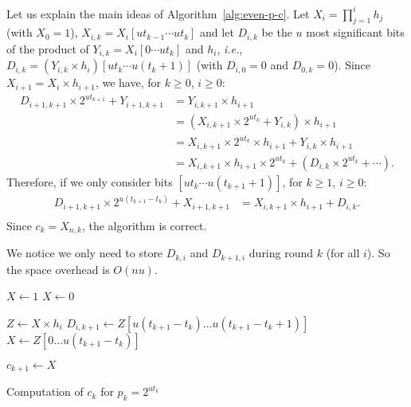 \documentclass[11pt]{llncs}
\begin{document}
Let us explain the main ideas of Algorithm~\ref{alg:even-p-c}.
Let $X_i = \prod_{j=1}^i h_j$ (with $X_0 = 1$), $X_{i,k} = X_i[ut_{k-1}\cdots ut_{k}]$ and let $D_{i,k}$ be the $u$ most significant bits of the product of $Y_{i,k} = X_i[0\cdots ut_{k}]$ and $h_i$, {\it i.e.}, $D_{i,k} = (Y_{i,k} \times h_i)[ut_k\cdots u(t_k+1)]$ (with $D_{i,0} = 0$ and $D_{0,k} = 0$).
Since $X_{i+1} = X_i \times h_{i+1}$, we have, for $k \ge 0$, $i \ge 0$:
\begin{align*}
  D_{i+1,k+1} \times 2^{ut_{k+1}} + Y_{i+1,k+1} &= Y_{i,k+1} \times h_{i+1} \\
                 &= (X_{i,k+1} \times 2^{ut_{k}} + Y_{i,k}) \times h_{i+1} \\
                 &= X_{i,k+1} \times 2^{ut_k} \times h_{i+1} + Y_{i,k} \times h_{i+1} \\
                 &= X_{i,k+1}  \times h_{i+1} \times 2^{ut_k} + (D_{i,k} \times 2^{ut_k} + \cdots).
\end{align*}
Therefore, if we only consider bits $[ut_k \cdots u(t_{k+1}+1)]$, for $k\ge1$, $i\ge0$:
\begin{align*}
  D_{i+1,k+1} \times 2^{u(t_{k+1}-t_k)} + X_{i+1,k+1} &= X_{i,k+1} \times h_{i+1} + D_{i,k}. \\
\end{align*}
Since $c_k = X_{n,k}$, the algorithm is correct.

We notice we only need to store $D_{k,i}$ and $D_{k+1,i}$ during round $k$ (for all $i$).
So the space overhead is $O(nu)$.


\begin{algorithm}
\newcommand{\vstart}{\ensuremath{\mathrm{start}}}
\newcommand{\vmid}{\ensuremath{\mathrm{mid}}}
\newcommand{\vend}{\ensuremath{\mathrm{end}}}
\begin{algorithmic}[1]

  \State $X \gets 1$
\Else
  \State $X \gets 0$
\EndIf

  \State $Z \gets X \times h_i$
  \State $D_{i,k+1} \gets Z[u(t_{k+1}-t_k)\dots u(t_{k+1}-t_k+1)]$
  \State $X \gets Z[0\dots u(t_{k+1}-t_k)]$
\EndFor

\State $c_{k+1} \gets X$
\end{algorithmic}
\caption{Computation of $c_k$ for $p_k = 2^{ut_k}$}
\label{alg:even-p-c}
\end{algorithm}
\end{document}
